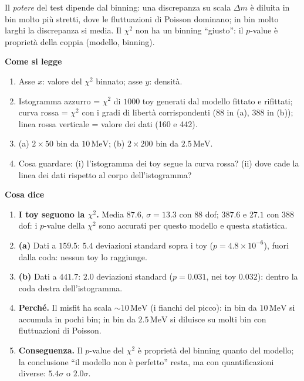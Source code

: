 \documentclass[10.5pt,a4paper]{article}
\newcommand{\MeV}{\,\mathrm{MeV}}
\newcommand{\sez}[1]{\par\Needspace{6\baselineskip}\medskip\noindent\textbf{\large #1}\par\nopagebreak\smallskip}
\begin{document}
Il \emph{potere} del test dipende dal binning: una discrepanza su scala $\Delta m$ è diluita in bin molto più stretti, dove le fluttuazioni di Poisson dominano; in bin molto larghi la discrepanza si media. Il $\chi^2$ non ha un binning ``giusto'': il $p$-value è proprietà della coppia (modello, binning).

\sez{Come si legge}
\begin{enumerate}
\item Asse $x$: valore del $\chi^2$ binnato; asse $y$: densità.
\item Istogramma azzurro = $\chi^2$ di $1000$ toy generati dal modello fittato e rifittati; curva rossa = $\chi^2$ con i gradi di libertà corrispondenti (88 in (a), 388 in (b)); linea rossa verticale = valore dei dati (160 e 442).
\item (a) $2\times50$ bin da $10\MeV$; (b) $2\times200$ bin da $2.5\MeV$.
\item Cosa guardare: (i) l'istogramma dei toy segue la curva rossa? (ii) dove cade la linea dei dati rispetto al corpo dell'istogramma?
\end{enumerate}

\sez{Cosa dice}
\begin{enumerate}
\item \textbf{I toy seguono la $\chi^2$.} Media $87.6$, $\sigma=13.3$ con $88$ dof; $387.6$ e $27.1$ con $388$ dof: i $p$-value della $\chi^2$ sono accurati per questo modello e questa statistica.
\item \textbf{(a)} Dati a $159.5$: $5.4$ deviazioni standard sopra i toy ($p=4.8\times10^{-6}$), fuori dalla coda: nessun toy lo raggiunge.
\item \textbf{(b)} Dati a $441.7$: $2.0$ deviazioni standard ($p=0.031$, nei toy $0.032$): dentro la coda destra dell'istogramma.
\item \textbf{Perché.} Il misfit ha scala $\sim10\MeV$ (i fianchi del picco): in bin da $10\MeV$ si accumula in pochi bin; in bin da $2.5\MeV$ si diluisce su molti bin con fluttuazioni di Poisson.
\item \textbf{Conseguenza.} Il $p$-value del $\chi^2$ è proprietà del binning quanto del modello; la conclusione ``il modello non è perfetto'' resta, ma con quantificazioni diverse: $5.4\sigma$ o $2.0\sigma$.
\end{enumerate}
\end{document}

